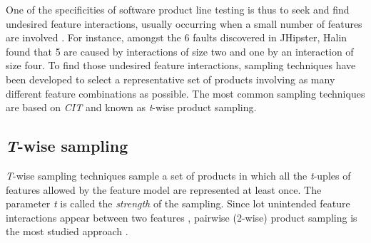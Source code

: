 One of the specificities of software product line testing is thus to seek and find undesired feature interactions, usually occurring when a small number of features are involved \cite{Kuhn2004}. For instance, amongst the 6 faults discovered in JHipster, Halin \etal \cite{Halin2017b} found that 5 are caused by interactions of size two and one by an interaction of size four. To find those undesired feature interactions, sampling techniques have been developed to select a representative set of products involving as many different feature combinations as possible. The most common sampling techniques are based on \emph{\gls{CIT}} and known as \textit{t}-wise product sampling.

\subsection{\textit{T}-wise sampling}


\textit{T}-wise sampling techniques sample a set of products in which all the \textit{t}-uples of features allowed by the feature model are represented at least once. The parameter \textit{t} is called the \emph{strength} of the sampling. Since lot unintended feature interactions appear between two features \cite{Kuhn2004}, pairwise (2-wise) product sampling is the most studied approach \cite{Lopez-Herrejon2015a,Machado2014}. 

